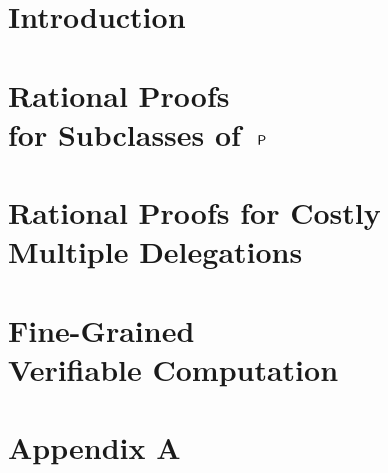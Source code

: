 \documentclass[justified,nobib]{tufte-book}
\begin{document}
\setcounter{page}{1}
	


% 


\pagestyle{fancy}

\chapter{Introduction}


%

\chapter[Rational Proofs for Subclasses of $\P$]{Rational Proofs\\for Subclasses of $\ \P$}
\label{chap:RP-expr}


\chapter[Rational Proofs for Costly Multiple Delegations]{Rational Proofs for Costly\\Multiple Delegations}
\label{chap:RP-seq}


\chapter[Fine-Grained Verifiable Computation]{Fine-Grained\\Verifiable Computation}
\label{chap:FG}


\appendix
\chapter{Appendix A}
\label{app:fg-rational}

%



\printbibliography
\end{document}
